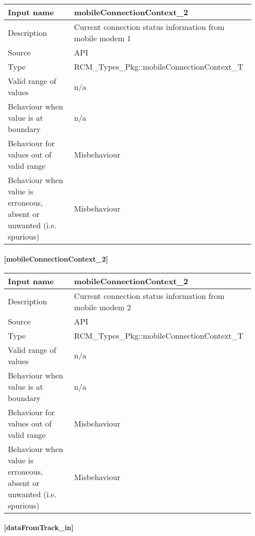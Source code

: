 \begin{longtable}{p{}p{}}
	\toprule
	Input name				& mobileConnectionContext\_2 \\
	\midrule
	Description				& Current connection status information from mobile modem 1 \\
	\midrule
	Source					& API \\ 
	\midrule
	Type					& RCM\_Types\_Pkg::mobileConnectionContext\_T \\
	\midrule
	Valid range of values	& n/a \\
	\midrule
	Behaviour when value is at boundary	& n/a \\
	\midrule
	Behaviour for values out of valid range	& Misbehaviour \\
	\midrule
	Behaviour when value is erroneous, absent or unwanted (i.e. spurious) & Misbehaviour \\
	\bottomrule
\end{longtable}

\paragraph{[mobileConnectionContext\_2]}

\begin{longtable}{p{}p{}}
	\toprule
	Input name				& mobileConnectionContext\_2 \\
	\midrule
	Description				& Current connection status information from mobile modem 2 \\
	\midrule
	Source					& API \\ 
	\midrule
	Type					& RCM\_Types\_Pkg::mobileConnectionContext\_T \\
	\midrule
	Valid range of values	& n/a \\
	\midrule
	Behaviour when value is at boundary	& n/a \\
	\midrule
	Behaviour for values out of valid range	& Misbehaviour \\
	\midrule
	Behaviour when value is erroneous, absent or unwanted (i.e. spurious) & Misbehaviour \\
	\bottomrule
\end{longtable}

\paragraph{[dataFromTrack\_in]}

